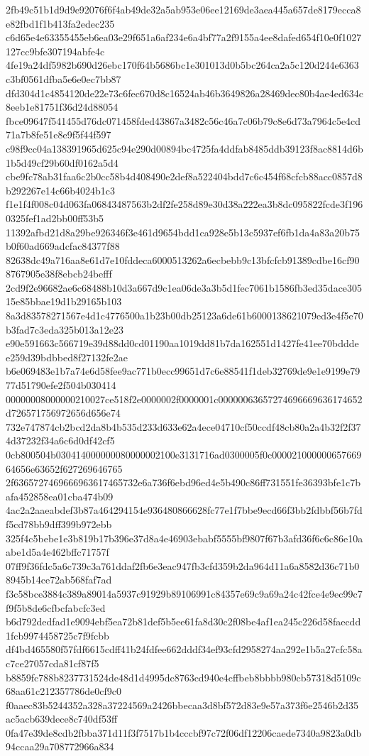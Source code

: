 {2fb49c51b1d9d9e92076f6f4ab49de32a5ab953e06ee12169de3aea445a657de8179ecca8e82fbd1f1b413fa2edec235
c6d65e4e63355455eb6ea03e29f651a6af234e6a4bf77a2f9155a4ee8dafed654f10e0f1027127cc9bfe307194abfe4c
4fe19a24df5982b690d26ebc170f64b5686bc1e301013d0b5bc264ca2a5c120d244e6363c3bf0561dfba5e6e0ec7bb87
dfd304d1c4854120de22e73c6fec670d8c16524ab46b3649826a28469dec80b4ae4ed634c8eeb1e81751f36d24d88054
fbce09647f541455d76dc071458fded43867a3482c56c46a7c06b79c8e6d73a7964c5e4cd71a7b8fe51e8e9f5f44f597
c98f9cc04a138391965d625c94e290d00894bc4725fa4ddfab8485ddb39123f8ac8814d6b1b5d49cf29b60df0162a5d4
cbe9fc78ab31faa6c2b0cc58b4d408490e2def8a522404bdd7c6c454f68cfcb88acc0857d8b292267e14c66b4024b1c3
f1e1f4f008c04d063fa06843487563b2df2fe258d89e30d38a222ea3b8dc095822fcde3f1960325fef1ad2bb00ff53b5
11392afbd21d8a29be926346f3e461d9654bdd1ca928e5b13c5937ef6fb1da4a83a20b75b0f60ad669adcfac84377f88
82638dc49a716aa8e61d7e10fddeca6000513262a6ecbebb9c13bfcfcb91389cdbe16cf908767905e38f8ebcb24befff
2cd9f2e96682ae6c68488b10d3a667d9c1ea06de3a3b5d1fec7061b1586fb3ed35dace30515e85bbae19d1b29165b103
8a3d83578271567e4d1c4776500a1b23b00db25123a6de61b6000138621079ed3e4f5e70b3fad7c3eda325b013a12e23
e90e591663c566719e39d88dd0cd01190aa1019dd81b7da162551d1427fe41ee70bdddee259d39bdbbed8f27132fe2ae
b6e069483e1b7a74e6d58fee9ac771b0ecc99651d7c6e88541f1deb32769de9e1e9199e7977d51790efe2f504b030414
00000008000000210027ce518f2e0000002f0000001c00000063657274696669636174652d726571756972656d656e74
732e747874cb2bcd2da8b4b535d233d633e62a4ece04710cf50ccdf48cb80a2a4b32f2f374d37232f34a6c6d0df42cf5
0cb800504b030414000000080000002100e3131716ad0300005f0c00002100000065766964656e63652f627269646765
2f6365727469666963617465732e6a736f6ebd96ed4e5b490c86ff731551fe36393bfe1c7bafa452858ea01cba474b09
4ac2a2aaeabdef3b87a464294154e936480866628fc77e1f7bbe9ecd66f3bb2fdbbf56b7fdf5cd78bb9dff399b972ebb
325f4c5bebe1e3b819b17b396e37d8a4e46903ebabf5555bf9807f67b3afd36f6c6c86e10aabe1d5a4e462bffc71757f
07ff9f36fdc5a6c739c3a761ddaf2fb6e3eac947fb3cfd359b2da964d11a6a8582d36c71b08945b14ce72ab568faf7ad
f3c58bce3884c389a89014a5937c91929b89106991c84357e69c9a69a24c42fce4e9ec99c7f9f5b8de6cfbcfabcfc3ed
b6d792dedfad1e9094ebf5ea72b81def5b5ee61fa8d30c2f08be4af1ea245c226d58faecdd1fcb9974458725c7f9fcbb
df4bd465580f57fdf6615cdff41b24fdfee662dddf34ef93cfd2958274aa292e1b5a27cfc58ac7ce27057cda81cf87f5
b8859fc788b8237731524de48d1d4995dc8763cd940e4cffbeb8bbbb980cb57318d5109c68aa61c212357786de0cf9c0
f0aaec83b5244352a328a37224569a2426bbecaa3d8bf572d83e9e57a373f6e2546b2d35ac5acb639dece8c740df53ff
0fa47e39de8cdb2fbba371d11f3f7517b1b4cccbf97c72f06df12206caede7340a9823a0db94ccaa29a708772966a834
}
